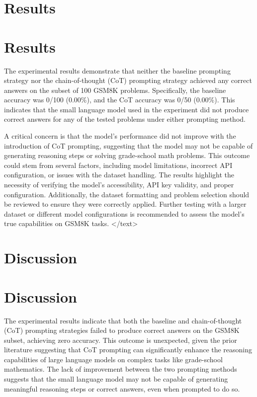 \documentclass{article}
\begin{document}
\section{Results}
\section{Results}

The experimental results demonstrate that neither the baseline prompting strategy nor the chain-of-thought (CoT) prompting strategy achieved any correct answers on the subset of 100 GSM8K problems. Specifically, the baseline accuracy was 0/100 (0.00\%), and the CoT accuracy was 0/50 (0.00\%). This indicates that the small language model used in the experiment did not produce correct answers for any of the tested problems under either prompting method.

A critical concern is that the model's performance did not improve with the introduction of CoT prompting, suggesting that the model may not be capable of generating reasoning steps or solving grade-school math problems. This outcome could stem from several factors, including model limitations, incorrect API configuration, or issues with the dataset handling. The results highlight the necessity of verifying the model's accessibility, API key validity, and proper configuration. Additionally, the dataset formatting and problem selection should be reviewed to ensure they were correctly applied. Further testing with a larger dataset or different model configurations is recommended to assess the model's true capabilities on GSM8K tasks.
</text>
\section{Discussion}
\section*{Discussion}

The experimental results indicate that both the baseline and chain-of-thought (CoT) prompting strategies failed to produce correct answers on the GSM8K subset, achieving zero accuracy. This outcome is unexpected, given the prior literature suggesting that CoT prompting can significantly enhance the reasoning capabilities of large language models on complex tasks like grade-school mathematics. The lack of improvement between the two prompting methods suggests that the small language model may not be capable of generating meaningful reasoning steps or correct answers, even when prompted to do so.
\end{document}
